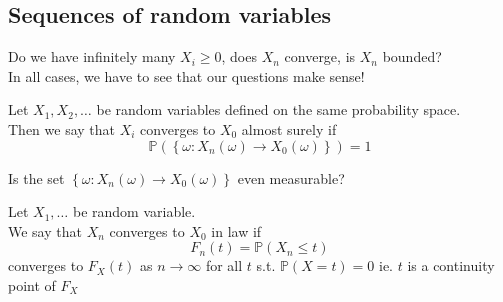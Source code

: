 \documentclass[../main.tex]{subfiles}
\begin{document}
\subsection{Sequences of random variables}
Do we have infinitely many $X_i \geq 0$, does $X_n$ converge, is $X_n$ bounded?\\
In all cases, we have to see that our questions make sense!
\begin{defn}
	Let $X_1,X_2,\ldots$ be random variables defined on the same probability space.\\
	Then we say that $X_i$ converges to $X_0$ almost surely if
	\[ 
	\mathbb{P}( \left\{ \omega: X_n( \omega) \to X_0( \omega)  \right\} ) =1
	\]
		
\end{defn}
Is the set $ \left\{ \omega: X_n( \omega) \to X_0( \omega)  \right\} $ even measurable?\\
\begin{defn}
	Let $X_1,\ldots$ be random variable.\\
	We say that $X_n$ converges to $X_0$ in law if 
	\[ 
	F_n( t) = \mathbb{P}( X_n \leq t) 
	\]
	converges to $F_X( t) $ as $n\to \infty $ for all $t$ s.t. $\mathbb{P}( X=t) =0$ ie. $t$ is a continuity point of $F_X$
\end{defn}




		
\end{document}
